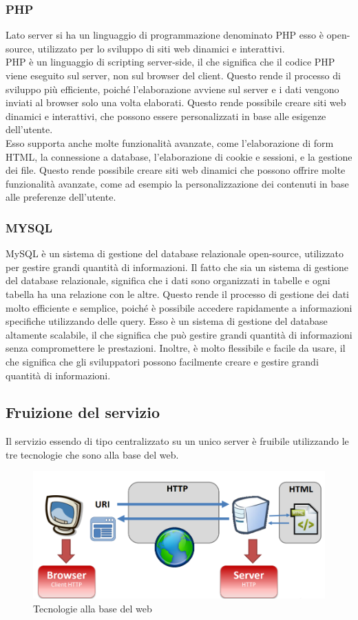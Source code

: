 \documentclass[a4paper,final,12pt]{report}
\begin{document}
\subsubsection{PHP}
Lato server si ha un linguaggio di programmazione denominato PHP esso è open-source, utilizzato per lo sviluppo di siti web dinamici e interattivi. \\ PHP è un linguaggio di scripting server-side, il che significa che il codice PHP viene eseguito sul server, non sul browser del client. Questo rende il processo di sviluppo più efficiente, poiché l'elaborazione avviene sul server e i dati vengono inviati al browser solo una volta elaborati. Questo rende possibile creare siti web dinamici e interattivi, che possono essere personalizzati in base alle esigenze dell'utente. \\ Esso supporta anche molte funzionalità avanzate, come l'elaborazione di form HTML, la connessione a database, l'elaborazione di cookie e sessioni, e la gestione dei file. Questo rende possibile creare siti web dinamici che possono offrire molte funzionalità avanzate, come ad esempio la personalizzazione dei contenuti in base alle preferenze dell'utente.

\subsubsection{MYSQL}
MySQL è un sistema di gestione del database relazionale open-source, utilizzato per gestire grandi quantità di informazioni. Il fatto che sia un sistema di gestione del database relazionale, significa che i dati sono organizzati in tabelle e ogni tabella ha una relazione con le altre. Questo rende il processo di gestione dei dati molto efficiente e semplice, poiché è possibile accedere rapidamente a informazioni specifiche utilizzando delle query. Esso è un sistema di gestione del database altamente scalabile, il che significa che può gestire grandi quantità di informazioni senza compromettere le prestazioni. Inoltre, è molto flessibile e facile da usare, il che significa che gli sviluppatori possono facilmente creare e gestire grandi quantità di informazioni.

\subsection{Fruizione del servizio}
Il servizio essendo di tipo centralizzato su un unico server è fruibile utilizzando le tre tecnologie che sono alla base del web.
\begin{figure}[hbtp]
\centering
\includegraphics[scale=0.60]{img_concettuale/tecnologie.png}
\caption{Tecnologie alla base del web}
\end{figure} 
\end{document}
